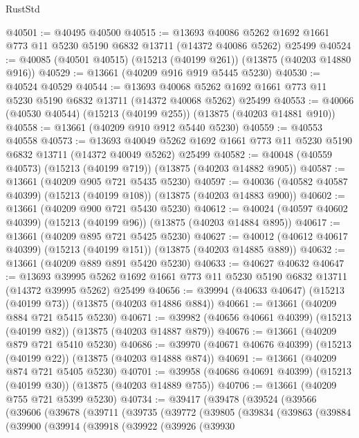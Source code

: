 \begin{lexlean}{RustStd}
\begin{coremodule}
@40501 := @40495 @40500
@40515 := @13693
    @40086
    @5262
    @1692
    @1661
    @773
    @11
    @5230
    @5190
    @6832
    @13711
    (@14372 @40086 @5262)
    @25499
@40524 := @40085 (@40501 @40515) (@15213 (@40199 @261)) (@13875 (@40203 @14880 @916))
@40529 := @13661 (@40209 @916 @919 @5445 @5230)
@40530 := @40524 @40529
@40544 := @13693
    @40068
    @5262
    @1692
    @1661
    @773
    @11
    @5230
    @5190
    @6832
    @13711
    (@14372 @40068 @5262)
    @25499
@40553 := @40066 (@40530 @40544) (@15213 (@40199 @255)) (@13875 (@40203 @14881 @910))
@40558 := @13661 (@40209 @910 @912 @5440 @5230)
@40559 := @40553 @40558
@40573 := @13693
    @40049
    @5262
    @1692
    @1661
    @773
    @11
    @5230
    @5190
    @6832
    @13711
    (@14372 @40049 @5262)
    @25499
@40582 := @40048 (@40559 @40573) (@15213 (@40199 @719)) (@13875 (@40203 @14882 @905))
@40587 := @13661 (@40209 @905 @721 @5435 @5230)
@40597 := @40036 (@40582 @40587 @40399) (@15213 (@40199 @108)) (@13875 (@40203 @14883 @900))
@40602 := @13661 (@40209 @900 @721 @5430 @5230)
@40612 := @40024 (@40597 @40602 @40399) (@15213 (@40199 @96)) (@13875 (@40203 @14884 @895))
@40617 := @13661 (@40209 @895 @721 @5425 @5230)
@40627 := @40012 (@40612 @40617 @40399) (@15213 (@40199 @151)) (@13875 (@40203 @14885 @889))
@40632 := @13661 (@40209 @889 @891 @5420 @5230)
@40633 := @40627 @40632
@40647 := @13693
    @39995
    @5262
    @1692
    @1661
    @773
    @11
    @5230
    @5190
    @6832
    @13711
    (@14372 @39995 @5262)
    @25499
@40656 := @39994 (@40633 @40647) (@15213 (@40199 @73)) (@13875 (@40203 @14886 @884))
@40661 := @13661 (@40209 @884 @721 @5415 @5230)
@40671 := @39982 (@40656 @40661 @40399) (@15213 (@40199 @82)) (@13875 (@40203 @14887 @879))
@40676 := @13661 (@40209 @879 @721 @5410 @5230)
@40686 := @39970 (@40671 @40676 @40399) (@15213 (@40199 @22)) (@13875 (@40203 @14888 @874))
@40691 := @13661 (@40209 @874 @721 @5405 @5230)
@40701 := @39958 (@40686 @40691 @40399) (@15213 (@40199 @30)) (@13875 (@40203 @14889 @755))
@40706 := @13661 (@40209 @755 @721 @5399 @5230)
@40734 := @39417
    (@39478
      (@39524
        (@39566
          (@39606
            (@39678
              (@39711
                (@39735
                  (@39772
                    (@39805
                      (@39834
                        (@39863
                          (@39884
                            (@39900
                              (@39914
                                (@39918
                                  (@39922
                                    (@39926
                                      (@39930

\end{coremodule}
\end{lexlean}
